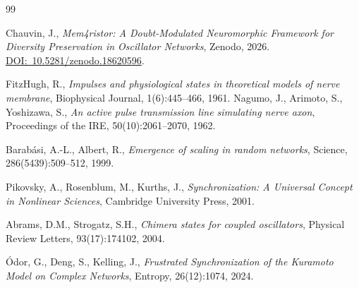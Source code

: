 \documentclass[11pt,a4paper]{article}
\begin{document}
\begin{thebibliography}{99}

 Chauvin, J., \emph{Mem4ristor: A Doubt-Modulated Neuromorphic Framework for Diversity Preservation in Oscillator Networks}, Zenodo, 2026. \href{https://doi.org/10.5281/zenodo.18620596}{DOI:~10.5281/zenodo.18620596}.

 FitzHugh, R., \emph{Impulses and physiological states in theoretical models of nerve membrane}, Biophysical Journal, 1(6):445--466, 1961.
 Nagumo, J., Arimoto, S., Yoshizawa, S., \emph{An active pulse transmission line simulating nerve axon}, Proceedings of the IRE, 50(10):2061--2070, 1962.

 Barab\'asi, A.-L., Albert, R., \emph{Emergence of scaling in random networks}, Science, 286(5439):509--512, 1999.

 Pikovsky, A., Rosenblum, M., Kurths, J., \emph{Synchronization: A Universal Concept in Nonlinear Sciences}, Cambridge University Press, 2001.

 Abrams, D.M., Strogatz, S.H., \emph{Chimera states for coupled oscillators}, Physical Review Letters, 93(17):174102, 2004.

 \'Odor, G., Deng, S., Kelling, J., \emph{Frustrated Synchronization of the Kuramoto Model on Complex Networks}, Entropy, 26(12):1074, 2024.

\end{thebibliography}
\end{document}
